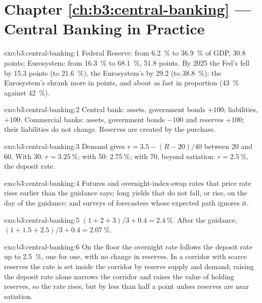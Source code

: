 \section*{Chapter \ref{ch:b3:central-banking} --- Central Banking in Practice}

\begin{solution}{exo:b3:central-banking:1}
Federal Reserve: from 6.2~\% to 36.9~\% of GDP, 30.8 points; Eurosystem: from 16.3~\% to
68.1~\%, 51.8 points. By 2025 the Fed's fell by 15.3 points (to 21.6~\%), the
Eurosystem's by 29.2 (to 38.8~\%): the Eurosystem's shrank more in points, and about
as fast in proportion (43~\% against 42~\%). %
\end{solution}

\begin{solution}{exo:b3:central-banking:2}
Central bank: assets, government bonds $+100$; liabilities,  $+100$.
Commercial banks: assets, government bonds $-100$ and reserves $+100$; their
liabilities do not change. Reserves are created by the purchase.
\end{solution}

\begin{solution}{exo:b3:central-banking:3}
Demand gives $r = 3.5 - (R - 20)/40$ between 20 and 60. With 30: $r = 3.25~\%$; with 50: $2.75~\%$;
with 70, beyond satiation: $r = 2.5~\%$, the deposit rate.
\end{solution}

\begin{solution}{exo:b3:central-banking:4}
Futures and overnight-index-swap rates that price rate rises earlier than the
guidance says; long yields that do not fall, or rise, on the day of the guidance;
and surveys of forecasters whose expected path ignores it.
\end{solution}

\begin{solution}{exo:b3:central-banking:5}
$(1 + 2 + 3)/3 + 0.4 = 2.4~\%$. After the guidance, $(1 + 1.5 + 2.5)/3 + 0.4 = 2.07~\%$.
\end{solution}

\begin{solution}{exo:b3:central-banking:6}
On the floor the overnight rate follows the deposit rate up to 2.5~\%, one for one,
with no change in reserves. In a corridor with scarce reserves the rate is set
inside the corridor by reserve supply and demand; raising the deposit rate alone
narrows the corridor and raises the value of holding reserves, so the rate rises,
but by less than half a point unless reserves are near satiation.
\end{solution}

